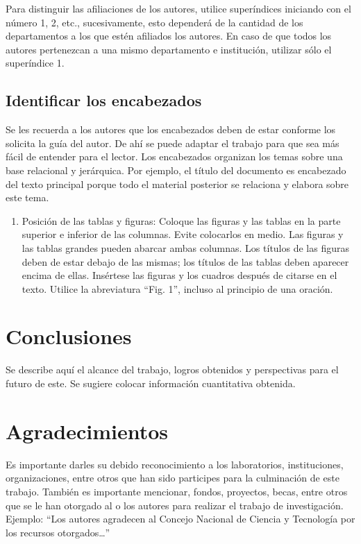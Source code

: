     Para distinguir las afiliaciones de los autores, utilice superíndices iniciando con el número 1, 2, etc., sucesivamente, esto dependerá de la cantidad de los departamentos a los que estén afiliados los autores. En caso de que todos los autores pertenezcan a una mismo departamento e institución, utilizar sólo el superíndice 1. 
    
    \subsection{Identificar los encabezados}
    
    Se les recuerda a los autores que los encabezados deben de estar conforme los solicita la guía del autor. De ahí se puede adaptar el trabajo para que sea más fácil de entender para el lector.
    Los encabezados organizan los temas sobre una base relacional y jerárquica. Por ejemplo, el título del documento es encabezado del texto principal porque todo el material posterior se relaciona y elabora sobre este tema. 
    
    \begin{enumerate}
        \item Posición de las tablas y figuras: Coloque las figuras y las tablas en la parte superior e inferior de las columnas. Evite colocarlos en medio. Las figuras y las tablas grandes pueden abarcar ambas columnas. Los títulos de las figuras deben de estar debajo de las mismas; los títulos de las tablas deben aparecer encima de ellas. Insértese las figuras y los cuadros después de citarse en el texto. Utilice la abreviatura “Fig. 1”, incluso al principio de una oración. 
    \end{enumerate}
    
    \section{Conclusiones}
    
    Se describe aquí el alcance del trabajo, logros obtenidos y perspectivas para el futuro de este. Se sugiere colocar información cuantitativa obtenida.
    
    \section{Agradecimientos}
    
    Es importante darles su debido reconocimiento a los laboratorios, instituciones, organizaciones, entre otros que han sido participes para la culminación de este trabajo. También es importante mencionar, fondos, proyectos, becas, entre otros que se le han otorgado al o los autores para realizar el trabajo de investigación. Ejemplo: “Los autores agradecen al Concejo Nacional de Ciencia y Tecnología por los recursos otorgados…”
    
